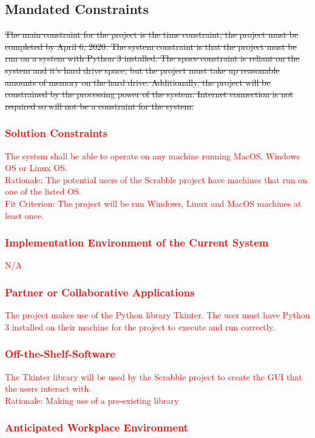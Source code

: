\documentclass[12pt, titlepage]{article}
\begin{document}
\subsection{Mandated Constraints}
    \sout{The main constraint for the project is the time constraint, the project must be completed by April 6, 2020. The system constraint is that the project must be run on a system with Python 3 installed. The space constraint is reliant on the system and it's hard drive space, but the project must take up reasonable amounts of memory on the hard drive. Additionally, the project will be constrained by the processing power of the system. Internet connection is not required so will not be a constraint for the system.}
\textcolor{red}{\subsubsection{\textcolor{red}{Solution Constraints}}}
    \textcolor{red}{The system shall be able to operate on any machine running MacOS, Windows OS or Linux OS. \\
    Rationale: The potential users of the Scrabble project have machines that run on one of the listed OS.\\
    Fit Criterion: The project will be run Windows, Linux and MacOS machines at least once.}
\textcolor{red}{\subsubsection{\textcolor{red}{Implementation Environment of the Current System}}}
    \textcolor{red}{N/A}
\textcolor{red}{\subsubsection{\textcolor{red}{Partner or Collaborative Applications}}}
    \textcolor{red}{The project makes use of the Python library Tkinter. The user must have Python 3 installed on their machine for the project to execute and run correctly.}
\textcolor{red}{\subsubsection{\textcolor{red}{Off-the-Shelf-Software}}}
    \textcolor{red}{The Tkinter library will be used by the Scrabble project to create the GUI that the users interact with. \\
    Rationale: Making use of a pre-existing library }
\textcolor{red}{\subsubsection{\textcolor{red}{Anticipated Workplace Environment}}}
\end{document}
